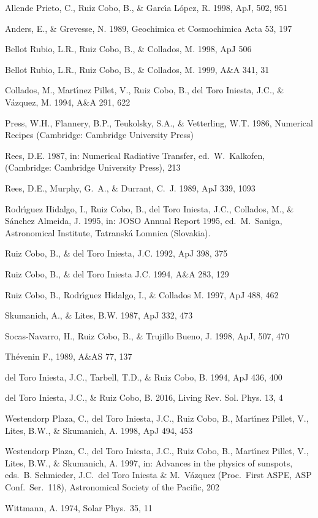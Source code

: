 \begin{thebibliography}{99}

\bibitem{} Allende Prieto, C., Ruiz Cobo, B., \& Garc\'{\i}a L\'opez, R. 1998, ApJ, 502, 951

\bibitem{} Anders, E., \& Grevesse, N. 1989, Geochimica et Cosmochimica Acta 53, 197 

\bibitem{} Bellot Rubio, L.R., Ruiz Cobo, B., \& Collados, M. 1998, ApJ 506

\bibitem{} Bellot Rubio, L.R., Ruiz Cobo, B., \& Collados, M. 1999, A\&A 341, 31

\bibitem{} Collados, M., Mart\'{\i}nez Pillet, V., Ruiz Cobo, B., del Toro Iniesta, J.C., 
\& V\'azquez, M. 1994, A\&A 291, 622 

\bibitem{} Press, W.H., Flannery, B.P., Teukolsky, S.A., \& Vetterling, W.T.
1986, Numerical Recipes (Cambridge:  Cambridge University Press)

\bibitem{} Rees, D.E. 1987, in: Numerical Radiative Transfer, ed.\ W.\ Kalkofen, (Cambridge: Cambridge University Press), 213

\bibitem{} Rees, D.E., Murphy, G.\ A., \& Durrant, C.\ J. 1989, ApJ 339, 1093

\bibitem{} Rodr\'{\i}guez Hidalgo, I., Ruiz Cobo, B., del Toro Iniesta, J.C.,
Collados, M., \& S\'anchez Almeida, J. 1995, in: JOSO Annual Report
1995, ed.\ M.\ Saniga, Astronomical Institute, Tatransk\'a Lomnica
(Slovakia).

\bibitem{} Ruiz Cobo, B., \&  del Toro Iniesta, J.C. 1992, ApJ  398, 375

\bibitem{} Ruiz Cobo, B., \& del Toro Iniesta J.C. 1994, A\&A 283, 129

\bibitem{} Ruiz Cobo, B., Rodr\'{\i}guez Hidalgo, I., \& Collados M. 1997, ApJ 488, 462

\bibitem{} Skumanich, A., \& Lites, B.W. 1987, ApJ 332, 473

\bibitem{} Socas-Navarro, H., Ruiz Cobo, B., \& Trujillo Bueno, J. 1998, ApJ, 507, 470

 Th\'evenin F., 1989, A\&AS 77, 137

\bibitem{} del Toro Iniesta, J.C., Tarbell, T.D., \& Ruiz Cobo, B. 1994, ApJ 436, 400

\bibitem{} del Toro Iniesta, J.C., \& Ruiz Cobo, B. 2016, Living Rev. Sol. Phys. 13, 4

\bibitem{} Westendorp Plaza, C., del Toro Iniesta, J.C., Ruiz Cobo, B., Mart\'{\i}nez Pillet, V., Lites, B.W., \& Skumanich, A. 1998, ApJ 494, 453

\bibitem{} Westendorp Plaza, C., del Toro Iniesta, J.C., Ruiz Cobo, B.,
Mart\'{\i}nez Pillet, V., Lites, B.W., \& Skumanich, A. 1997, in:
Advances in the physics of sunspots, eds.\ B. Schmieder, J.C.\ del Toro
Iniesta \& M.\ V\'azquez (Proc.\ First ASPE, ASP Conf.\  Ser.\ 118),
Astronomical Society of the Pacific, 202

\bibitem{} Wittmann, A. 1974, Solar Phys.\ 35, 11

\end{thebibliography}




 



 







